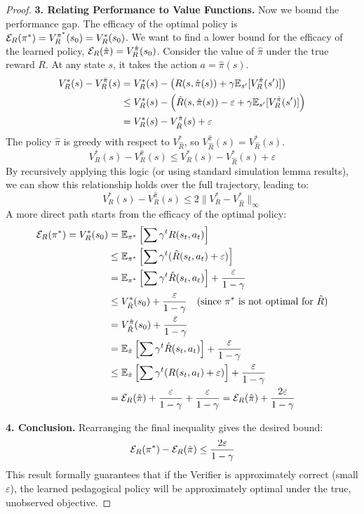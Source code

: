 \begin{proof}
\noindent\textbf{3. Relating Performance to Value Functions.}
Now we bound the performance gap. The efficacy of the optimal policy is $\mathcal{E}_R(\pi^*) = V^{\pi^*}_R(s_0) = V^*_R(s_0)$. We want to find a lower bound for the efficacy of the learned policy, $\mathcal{E}_R(\hat{\pi}) = V^{\hat{\pi}}_R(s_0)$.
Consider the value of $\hat{\pi}$ under the true reward $R$. At any state $s$, it takes the action $a = \hat{\pi}(s)$.
\begin{align*}
V^*_R(s) - V^{\hat{\pi}}_R(s) &= V^*_R(s) - \left( R(s,\hat{\pi}(s)) + \gamma \mathbb{E}_{s'}[V^{\hat{\pi}}_R(s')] \right) \\
&\le V^*_R(s) - \left( \hat{R}(s,\hat{\pi}(s)) - \varepsilon + \gamma \mathbb{E}_{s'}[V^{\hat{\pi}}_R(s')] \right) \\
&= V^*_R(s) - V^{\hat{\pi}}_{\hat{R}}(s) + \varepsilon
\end{align*}
The policy $\hat{\pi}$ is greedy with respect to $V^*_{\hat{R}}$, so $V^{\hat{\pi}}_{\hat{R}}(s) = V^*_{\hat{R}}(s)$.
\[ V^*_R(s) - V^{\hat{\pi}}_R(s) \le V^*_R(s) - V^*_{\hat{R}}(s) + \varepsilon \]
By recursively applying this logic (or using standard simulation lemma results), we can show this relationship holds over the full trajectory, leading to:
\[ V^*_R(s) - V^{\hat{\pi}}_R(s) \le 2 \|V^*_R - V^*_{\hat{R}}\|_{\infty} \]
A more direct path starts from the efficacy of the optimal policy:
\begin{align*}
\mathcal{E}_R(\pi^*) = V^*_R(s_0) &= \mathbb{E}_{\pi^*} \left[ \sum \gamma^t R(s_t, a_t) \right] \\
&\le \mathbb{E}_{\pi^*} \left[ \sum \gamma^t (\hat{R}(s_t, a_t) + \varepsilon) \right] \\
&= \mathbb{E}_{\pi^*} \left[ \sum \gamma^t \hat{R}(s_t, a_t) \right] + \frac{\varepsilon}{1-\gamma} \\
&\le V^*_{\hat{R}}(s_0) + \frac{\varepsilon}{1-\gamma} \quad (\text{since } \pi^* \text{ is not optimal for } \hat{R}) \\
&= V^{\hat{\pi}}_{\hat{R}}(s_0) + \frac{\varepsilon}{1-\gamma} \\
&= \mathbb{E}_{\hat{\pi}} \left[ \sum \gamma^t \hat{R}(s_t, a_t) \right] + \frac{\varepsilon}{1-\gamma} \\
&\le \mathbb{E}_{\hat{\pi}} \left[ \sum \gamma^t (R(s_t, a_t) + \varepsilon) \right] + \frac{\varepsilon}{1-\gamma} \\
&= \mathcal{E}_R(\hat{\pi}) + \frac{\varepsilon}{1-\gamma} + \frac{\varepsilon}{1-\gamma} = \mathcal{E}_R(\hat{\pi}) + \frac{2\varepsilon}{1-\gamma}
\end{align*}

\noindent\textbf{4. Conclusion.}
Rearranging the final inequality gives the desired bound:
\[ \mathcal{E}_R(\pi^*) - \mathcal{E}_R(\hat{\pi}) \le \frac{2\varepsilon}{1-\gamma} \]
This result formally guarantees that if the Verifier is approximately correct (small $\varepsilon$), the learned pedagogical policy will be approximately optimal under the true, unobserved objective.
\end{proof}

